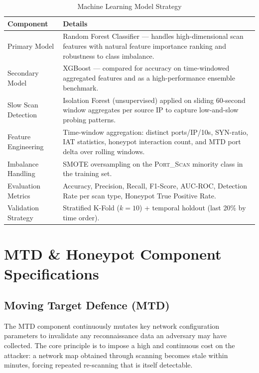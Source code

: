 \documentclass[12pt,a4paper]{report}
\begin{document}
\begin{table}[h!]
\centering
\caption{Machine Learning Model Strategy}
\begin{tabular}{@{}L{4cm} L{10.5cm}@{}}
  \toprule
  \textbf{Component} & \textbf{Details} \\
  \midrule
  Primary Model
    & Random Forest Classifier --- handles high-dimensional scan features with natural
      feature importance ranking and robustness to class imbalance. \\
  \addlinespace
  Secondary Model
    & XGBoost --- compared for accuracy on time-windowed aggregated features and as
      a high-performance ensemble benchmark. \\
  \addlinespace
  Slow Scan Detection
    & Isolation Forest (unsupervised) applied on sliding 60-second window aggregates
      per source IP to capture low-and-slow probing patterns. \\
  \addlinespace
  Feature Engineering
    & Time-window aggregation: distinct ports/IP/10s, SYN-ratio, IAT statistics, honeypot
      interaction count, and MTD port delta over rolling windows. \\
  \addlinespace
  Imbalance Handling
    & SMOTE oversampling on the \textsc{Port\_Scan} minority class in the training set. \\
  \addlinespace
  Evaluation Metrics
    & Accuracy, Precision, Recall, F1-Score, AUC-ROC, Detection Rate per scan type,
      Honeypot True Positive Rate. \\
  \addlinespace
  Validation Strategy
    & Stratified K-Fold ($k=10$) + temporal holdout (last 20\% by time order). \\
  \bottomrule
\end{tabular}
\label{tab:ml-strategy}
\end{table}

\chapter{MTD \& Honeypot Component Specifications}

\section{Moving Target Defence (MTD)}

The MTD component continuously mutates key network configuration parameters to invalidate
any reconnaissance data an adversary may have collected. The core principle is to impose a
high and continuous cost on the attacker: a network map obtained through scanning becomes
stale within minutes, forcing repeated re-scanning that is itself detectable.
\end{document}

